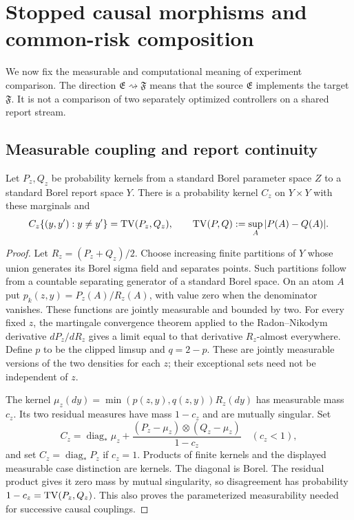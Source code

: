 \section{Stopped causal morphisms and common-risk composition}\label{sec:morphisms}
We now fix the measurable and computational meaning of experiment comparison. The direction $\mathfrak E\rightsquigarrow\mathfrak F$ means that the source $\mathfrak E$ implements the target $\mathfrak F$. It is not a comparison of two separately optimized controllers on a shared report stream.

\subsection{Measurable coupling and report continuity}
\begin{lemma}\label{lem:coupling}
Let $P_z,Q_z$ be probability kernels from a standard Borel parameter space $Z$ to a standard Borel report space $Y$. There is a probability kernel $C_z$ on $Y\times Y$ with these marginals and
\[
 C_z\{(y,y'):y\ne y'\}=\operatorname{TV}(P_z,Q_z),
 \qquad \operatorname{TV}(P,Q):=\sup_A|P(A)-Q(A)|.
\]
\end{lemma}
\begin{proof}
Let $R_z=(P_z+Q_z)/2$. Choose increasing finite partitions of $Y$ whose union generates its Borel sigma field and separates points. Such partitions follow from a countable separating generator of a standard Borel space. On an atom $A$ put $p_k(z,y)=P_z(A)/R_z(A)$, with value zero when the denominator vanishes. These functions are jointly measurable and bounded by two. For every fixed $z$, the martingale convergence theorem applied to the Radon--Nikodym derivative $dP_z/dR_z$ gives a limit equal to that derivative $R_z$-almost everywhere. Define $p$ to be the clipped limsup and $q=2-p$. These are jointly measurable versions of the two densities for each $z$; their exceptional sets need not be independent of $z$.

The kernel $\mu_z(dy)=\min(p(z,y),q(z,y))R_z(dy)$ has measurable mass $c_z$. Its two residual measures have mass $1-c_z$ and are mutually singular. Set
\[
 C_z=\operatorname{diag}_*\mu_z+
 \frac{(P_z-\mu_z)\otimes(Q_z-\mu_z)}{1-c_z}
 \quad(c_z<1),
\]
and set $C_z=\operatorname{diag}_*P_z$ if $c_z=1$. Products of finite kernels and the displayed measurable case distinction are kernels. The diagonal is Borel. The residual product gives it zero mass by mutual singularity, so disagreement has probability $1-c_z=\operatorname{TV}(P_z,Q_z)$. This also proves the parameterized measurability needed for successive causal couplings.
\end{proof}

